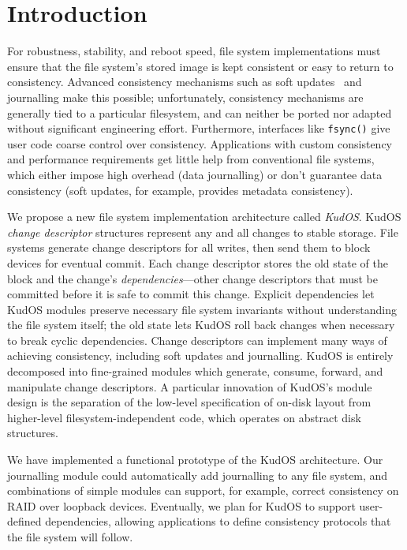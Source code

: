
\section*{Introduction}
\label{sec:intro}

For robustness, stability, and reboot speed, file system implementations
must ensure that the file system's stored image is kept consistent
or easy to return to consistency.
%
Advanced consistency mechanisms such as soft updates~\cite{ganger00soft}
and journalling make this possible; unfortunately,
%
consistency mechanisms are generally tied to a particular filesystem, and
can neither be ported nor adapted without significant engineering
effort.
%
Furthermore, interfaces like \verb+fsync()+ give user code coarse control
over consistency.
%
Applications with custom consistency and performance requirements get
little help from conventional file systems, which either impose high
overhead (data journalling) or don't guarantee data consistency (soft
updates, for example, provides metadata consistency).



We propose a new file system implementation architecture called
\emph{KudOS}.
%
KudOS \emph{change descriptor} structures represent any and all changes to
stable storage.
%
File systems generate change descriptors for all writes, then
send them to block devices for eventual commit.
%
Each change descriptor stores the old state of the block and the change's
\emph{dependencies}---other change descriptors that must be committed before
it is safe to commit this change.
%
Explicit dependencies let KudOS modules preserve necessary file system
invariants without understanding the file system itself; the old state
lets KudOS roll back changes when necessary to break cyclic dependencies.
%
Change descriptors can implement many ways of achieving
consistency, including soft updates and journalling.
%
%
%
KudOS is entirely decomposed into fine-grained modules which generate,
consume, forward, and manipulate change descriptors.
%
A particular innovation of KudOS's module design is the separation of the
low-level specification of on-disk layout from higher-level
filesystem-independent code, which operates on abstract disk
structures.

We have implemented a functional prototype of the KudOS
architecture.
%
Our journalling module could automatically add journalling to any file
system, and combinations of simple modules can support, for example,
correct consistency on RAID over loopback devices.
%
Eventually, we plan for KudOS to support user-defined dependencies,
allowing applications to define consistency protocols that the file system
will follow.

%
%
